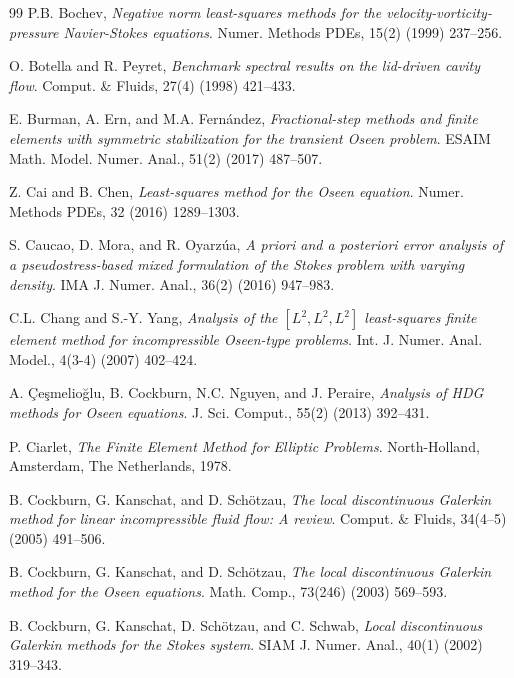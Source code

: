 \documentclass[reqno,a4paper]{article}
\numberwithin{equation}{section}
\begin{document}
\begin{thebibliography}{99}
   {\sc P.B. Bochev}, {\it Negative norm least-squares methods 
  for the velocity-vorticity-pressure Navier-Stokes equations}. 
Numer. Methods PDEs, 15(2) (1999) 237--256.

 {\sc O. Botella and R. Peyret}, {\it Benchmark spectral results on the 
lid-driven cavity flow}. Comput. \& Fluids, 27(4) (1998) 421--433. 

 {\sc E. Burman, A. Ern, and M.A. Fern\'andez}, {\it 
Fractional-step methods and finite elements with symmetric stabilization 
for the transient Oseen problem}.  ESAIM Math. Model. Numer. Anal.,
51(2) (2017) 487--507.

 {\sc Z. Cai and B. Chen}, {\it Least-squares method for the Oseen equation}. 
Numer. Methods PDEs, 32 (2016) 1289--1303.

 {\sc S. Caucao, D. Mora, and R. Oyarz\'ua}, {\it A priori and a 
posteriori error analysis of a pseudostress-based mixed formulation of the Stokes 
problem with varying density}.
IMA J. Numer. Anal., 36(2) (2016) 947--983.

{\sc C.L. Chang and S.-Y. Yang}, {\it Analysis of the $[L^2,L^2,L^2]$ 
  least-squares finite element method for incompressible Oseen-type problems}.
  Int. J. Numer. Anal. Model., 4(3-4) (2007) 402--424.
  
   {\sc A. \c{C}e\c{s}melio\u{g}lu, B. Cockburn, N.C. Nguyen, and J. Peraire},
   {\it Analysis of HDG methods for Oseen equations}.
   J. Sci. Comput., 55(2) (2013) 392--431.
   
  {\sc P. Ciarlet}, {\it The Finite Element Method for Elliptic Problems}.
  North-Holland, Amsterdam, The Netherlands, 1978. 
  
   {\sc B. Cockburn, G. Kanschat, and D. Sch\"{o}tzau},
   {\it The local discontinuous Galerkin method for linear incompressible fluid flow: A review}.
   Comput. \& Fluids, 34(4--5) (2005) 491--506.
   
 {\sc B. Cockburn, G. Kanschat, and D. Sch\"{o}tzau},
 {\it The local discontinuous Galerkin method for the Oseen equations}.
 Math. Comp., 73(246) (2003) 569--593.
 
 {\sc B. Cockburn, G. Kanschat, D. Sch\"{o}tzau, and C. Schwab},
 {\it Local discontinuous Galerkin methods for the Stokes system}.
 SIAM J. Numer. Anal., 40(1) (2002) 319--343.
 

\end{thebibliography}
\end{document}

